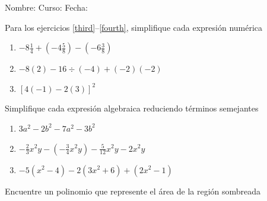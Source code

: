 \documentclass[letterpaper,fleqn]{article}
\newcommand{\LineaNombre}{%
\par
\vspace{\baselineskip}
Nombre:\hrulefill \; Curso: \underline{\hspace*{48pt}} \; Fecha: \underline{\hspace*{2.5cm}} \relax
\par}
\begin{document}
\LineaNombre
\begin{enumerate}
 \item Para los ejercicios \ref{third}--\ref{fourth}, simplifique cada expresión numérica
 \begin{enumerate}
 \item $-8\frac{1}{4}+\left(-4\frac{5}{8}\right)-\left(-6\frac{3}{8}\right)$\label{third}\noanswer
\item $-8(2)-16\div (-4)+(-2)(-2)$\noanswer
\item  $[4(-1)-2(3)]^{2}$\label{fourth}\noanswer
 \end{enumerate}
 \item Simplifique cada expresi\'{o}n algebraica reduciendo términos semejantes
 \begin{enumerate}
 \item $3a^{2}-2b^{2}-7a^{2}-3b^{2}$\noanswer
\item $-\frac{2}{3}x^{2}y-\left(-\frac{3}{4}x^{2}y\right)-\frac{5}{12}x^{2}y-2x^{2}y$\noanswer
\item $-5(x^{2}-4)-2(3x^{2}+6)+(2x^{2}-1)$\noanswer
 \end{enumerate}
 \begin{minipage}{.45\textwidth}
\item Encuentre un polinomio que represente el área de la región sombreada
\end{minipage}\hfill
\begin{minipage}{.45\textwidth}
\end{minipage}\noanswer

 \end{enumerate}
\end{document}
